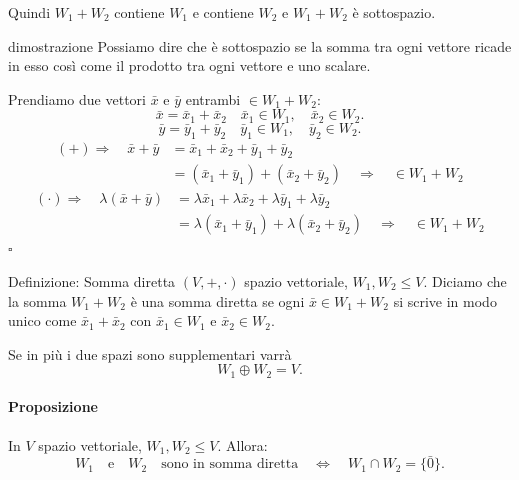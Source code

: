 \documentclass[x11names]{article}
\newcommand*{\QEDB}{\null\nobreak\hfill\ensuremath{\square}}%
\begin{document}
Quindi $W_1 + W_2$ contiene $W_1$ e contiene $W_2$ e $W_1 + W_2$ è sottospazio.
\begin{es}{dimostrazione}
Possiamo dire che è sottospazio se la somma tra ogni vettore ricade in esso così come il prodotto tra ogni vettore e uno scalare.

Prendiamo due vettori $\bar{x}$ e $\bar{y}$ entrambi $\in W_1 + W_2$:
\[
\bar{x} = \bar{x}_{1} + \bar{x}_{2} \quad \bar{x}_1 \in W_1, \quad \bar{x}_{2} \in W_2
.\] 
\[
\bar{y} = \bar{y}_{1} + \bar{y}_{2} \quad \bar{y}_1 \in W_1, \quad \bar{y}_{2} \in W_2
.\] 
\begin{align*}
	\left(+\right)\Rightarrow \quad \bar{x} + \bar{y} &= \bar{x}_{1} + \bar{x}_{2} + \bar{y}_{1} + \bar{y}_{2} \\
						      &= \left(\bar{x}_{1} + \bar{y}_{1}\right) + \left(\bar{x}_{2}+\bar{y}_{2}\right) \quad \Rightarrow \quad \in W_1 + W_2 
\end{align*}
\begin{align*}
	\left(\cdot\right) \Rightarrow \quad \lambda\left(\bar{x}+\bar{y}\right) &= \lambda \bar{x}_{1} + \lambda \bar{x}_{2} + \lambda \bar{y}_{1} + \lambda \bar{y}_{2} \\
						      &= \lambda\left(\bar{x}_{1} + \bar{y}_{1}\right) + \lambda\left(\bar{x}_{2}+\bar{y}_{2}\right) \quad \Rightarrow \quad \in W_1 + W_2
\end{align*}  \QEDB
\end{es}


\begin{center}
\colorbox{myblue}{\begin{minipage}{5.75in}
\begin{blues}{Definizione: Somma diretta}
$\left(V,+,\cdot\right)$ spazio vettoriale, $W_1,W_2 \leq V$. Diciamo che la somma $W_1+W_2$ è una somma diretta se ogni $\bar{x} \in W_1+W_2$ si scrive in modo unico come $\bar{x}_1 + \bar{x}_2$ con $\bar{x}_1 \in W_1$ e $\bar{x}_2 \in W_2 $.

Se in più i due spazi sono supplementari varrà
\[
W_1 \oplus W_2 = V
.\] 
\end{blues}
\end{minipage}}        
\end{center}

\paragraph{Proposizione}
In $V$ spazio vettoriale, $W_1,W_2 \leq V$. Allora:
\[
W_1 \quad \text{e} \quad W_2 \quad \text{sono in somma diretta} \quad \Longleftrightarrow \quad W_1 \cap W_2 = \{\bar{0}\} 
.\] 
\end{document}
